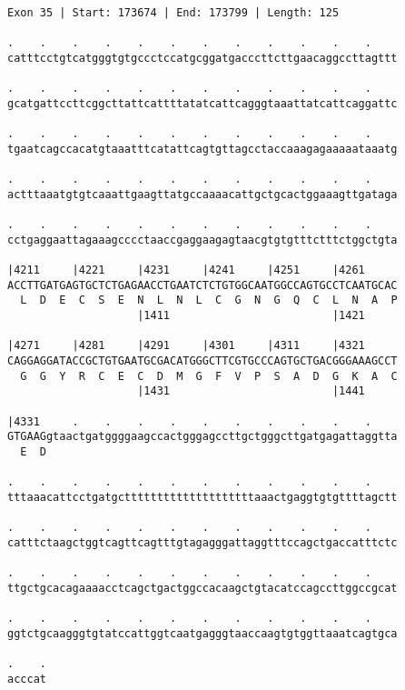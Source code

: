 \documentclass{article}
\begin{document}
\begin{Verbatim}
Exon 35 | Start: 173674 | End: 173799 | Length: 125
 
.    .    .    .    .    .    .    .    .    .    .    .    
catttcctgtcatgggtgtgccctccatgcggatgacccttcttgaacaggccttagttt
  
.    .    .    .    .    .    .    .    .    .    .    .    
gcatgattccttcggcttattcattttatatcattcagggtaaattatcattcaggattc
  
.    .    .    .    .    .    .    .    .    .    .    .    
tgaatcagccacatgtaaatttcatattcagtgttagcctaccaaagagaaaaataaatg
  
.    .    .    .    .    .    .    .    .    .    .    .    
actttaaatgtgtcaaattgaagttatgccaaaacattgctgcactggaaagttgataga
  
.    .    .    .    .    .    .    .    .    .    .    .    
cctgaggaattagaaagcccctaaccgaggaagagtaacgtgtgtttctttctggctgta
  
|4211     |4221     |4231     |4241     |4251     |4261     
ACCTTGATGAGTGCTCTGAGAACCTGAATCTCTGTGGCAATGGCCAGTGCCTCAATGCAC
  L  D  E  C  S  E  N  L  N  L  C  G  N  G  Q  C  L  N  A  P
                    |1411                         |1421     
  
|4271     |4281     |4291     |4301     |4311     |4321     
CAGGAGGATACCGCTGTGAATGCGACATGGGCTTCGTGCCCAGTGCTGACGGGAAAGCCT
  G  G  Y  R  C  E  C  D  M  G  F  V  P  S  A  D  G  K  A  C
                    |1431                         |1441     
  
|4331     .    .    .    .    .    .    .    .    .    .    
GTGAAGgtaactgatggggaagccactgggagccttgctgggcttgatgagattaggtta
  E  D                                                      
  
.    .    .    .    .    .    .    .    .    .    .    .    
tttaaacattcctgatgcttttttttttttttttttttaaactgaggtgtgttttagctt
  
.    .    .    .    .    .    .    .    .    .    .    .    
catttctaagctggtcagttcagtttgtagagggattaggtttccagctgaccatttctc
  
.    .    .    .    .    .    .    .    .    .    .    .    
ttgctgcacagaaaacctcagctgactggccacaagctgtacatccagccttggccgcat
  
.    .    .    .    .    .    .    .    .    .    .    .    
ggtctgcaagggtgtatccattggtcaatgagggtaaccaagtgtggttaaatcagtgca
  
.    .
acccat
\end{Verbatim}
\newpage
\end{document}
